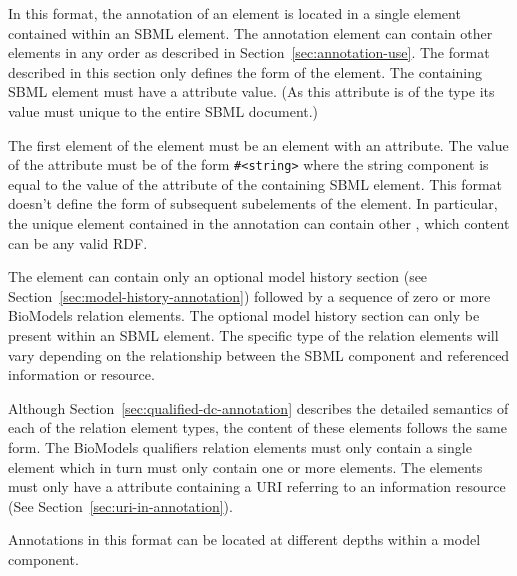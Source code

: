 In this format, the annotation of an element is located in a single
 element contained within an SBML
 element. The annotation element can contain
other elements in any order as described in 
Section~\ref{sec:annotation-use}.  The format described in this
section only defines the form of the  element. The
containing SBML \SBase element must have a  attribute
value. (As this attribute is of the type  its value
must unique to the entire SBML document.)


\begin{blockChanged}

The first element of the  element must be an
 element with an 
attribute. The value of the
 attribute must be of the form
\texttt{\#<string>} where the string component is equal to the
value of the  attribute of the containing SBML element.
This format doesn't define the form of subsequent
subelements of the  element. In particular, the unique  element contained in the annotation can contain other , which content can be any valid RDF.

\end{blockChanged}

The  element can contain only an optional
model history section (see
Section~\ref{sec:model-history-annotation}) followed by a sequence
of zero or more BioModels relation elements. The optional model
history section can only be present within an SBML \Model element.
The specific type of the relation elements will vary depending on
the relationship between the SBML component and referenced
information or resource.

Although Section~\ref{sec:qualified-dc-annotation} describes the
detailed semantics of each of the relation element types, the
content of these elements follows the same form.  The BioModels
qualifiers relation elements must only contain a single
 element which in turn must only contain one or
more  elements.  The  elements must
only have a  attribute containing a URI
referring to an information resource (See
Section~\ref{sec:uri-in-annotation}).

Annotations in this format can be located at different depths
within a model component.

